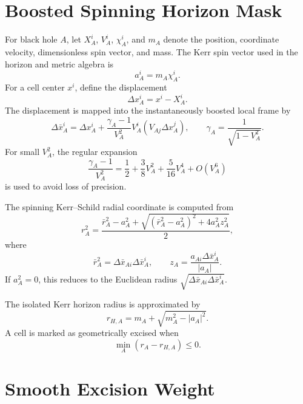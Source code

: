 \documentclass[11pt]{article}
\begin{document}
\section{Boosted Spinning Horizon Mask}

For black hole \(A\), let \(X_A^i\), \(V_A^i\), \(\chi_A^i\), and \(m_A\)
denote the position, coordinate velocity, dimensionless spin vector, and
mass.  The Kerr spin vector used in the horizon and metric algebra is
\begin{equation}
  a_A^i = m_A\chi_A^i .
\end{equation}
For a cell center \(x^i\), define the displacement
\begin{equation}
  \Delta x_A^i = x^i - X_A^i .
\end{equation}
The displacement is mapped into the instantaneously boosted local frame by
\begin{equation}
  \Delta \bar{x}_A^i
  =
  \Delta x_A^i
  +
  \frac{\gamma_A - 1}{V_A^2}
  V_A^i
  \left(V_{A j}\Delta x_A^j\right),
  \qquad
  \gamma_A = \frac{1}{\sqrt{1 - V_A^2}} .
\end{equation}
For small \(V_A^2\), the regular expansion
\begin{equation}
  \frac{\gamma_A - 1}{V_A^2}
  =
  \frac{1}{2}
  + \frac{3}{8} V_A^2
  + \frac{5}{16} V_A^4
  + O(V_A^6)
\end{equation}
is used to avoid loss of precision.

The spinning Kerr--Schild radial coordinate is computed from
\begin{equation}
  r_A^2 =
  \frac{
    \bar{r}_A^2 - a_A^2
    +
    \sqrt{\left(\bar{r}_A^2-a_A^2\right)^2 + 4a_A^2 z_A^2}
  }{2},
\end{equation}
where
\begin{equation}
  \bar{r}_A^2 = \Delta \bar{x}_{A i}\Delta \bar{x}_A^i,
  \qquad
  z_A = \frac{a_{A i}\Delta \bar{x}_A^i}{|a_A|}.
\end{equation}
If \(a_A^2=0\), this reduces to the Euclidean radius
\(\sqrt{\Delta \bar{x}_{A i}\Delta \bar{x}_A^i}\).

The isolated Kerr horizon radius is approximated by
\begin{equation}
  r_{H,A} = m_A + \sqrt{m_A^2 - |a_A|^2}.
\end{equation}
A cell is marked as geometrically excised when
\begin{equation}
  \min_A \left(r_A - r_{H,A}\right) \leq 0 .
\end{equation}

\section{Smooth Excision Weight}
\end{document}
